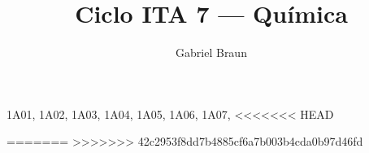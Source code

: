 \documentclass[braun]{braun}
\title{Ciclo ITA 7 --- Química}
\affiliation{Colégio e Curso Pensi, Turma IME-ITA}
\author{Gabriel Braun}
\begin{document}
\maketitle[botrule=true]

\makedata[front-data=true,math/math={ ln(2)/ln(10), ln(3)/ln(10) }, elements/style=ptable]

%                                              
%                                              

\InputDB
{
    1A01, 
    1A02,
    1A03,
    1A04,
    1A05,
    1A06,
    1A07,
<<<<<<< HEAD

=======
>>>>>>> 42c2953f8dd7b4885cf6a7b003b4cda0b97d46fd
}

\makegaba

%                                              
%                                              
\end{document}
